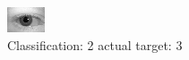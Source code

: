 \begin{figure}[h!]
\begin{center}
\includegraphics[width=0.60\columnwidth]{figures/ID586_class_2_target_3.png}
\end{center}
\caption{ Classification: 2 actual target: 3}
\label{fig:ID586_class_2_target_3}
\end{figure}

